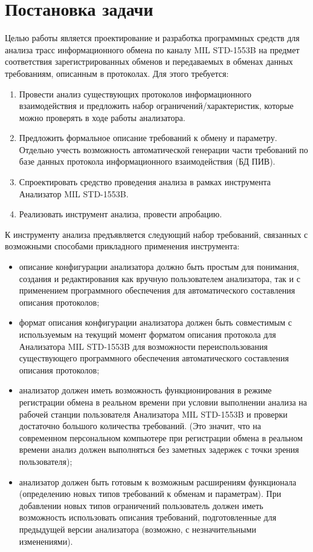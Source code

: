 \section{Постановка задачи}

Целью работы является проектирование и разработка программных средств для 
анализа трасс информационного обмена по каналу MIL STD-1553B на предмет 
соответствия зарегистрированных обменов и передаваемых в обменах данных 
требованиям, описанным в протоколах. Для этого требуется:

\begin{enumerate}
 \item Провести анализ существующих протоколов информационного 
взаимодействия и предложить набор ограничений/характеристик, которые можно 
проверять в ходе работы анализатора.
 \item Предложить формальное описание требований к обмену и параметру. Отдельно 
учесть возможность автоматической генерации части требований по базе данных 
протокола информационного взаимодействия (БД ПИВ).
 \item Спроектировать средство проведения анализа в рамках инструмента 
Анализатор MIL STD-1553B.
 \item Реализовать инструмент анализа, провести апробацию.
\end{enumerate}

К инструменту анализа предъявляется следующий набор требований, связанных с 
возможными способами прикладного применения инструмента:

\begin{itemize}
 \item описание конфигурации анализатора должно быть простым для 
понимания, создания и редактирования как вручную пользователем анализатора, так 
и с применением программного обеспечения для автоматического составления 
описания протоколов;
 \item формат описания конфигурации анализатора должен быть совместимым с 
используемым на текущий момент форматом описания протокола для Анализатора 
MIL STD-1553B для возможности переиспользования существующего программного 
обеспечения автоматического составления описания протоколов;
 \item анализатор должен иметь возможность функционирования в режиме 
регистрации обмена в реальном времени при условии выполнении анализа на 
рабочей станции пользователя Анализатора MIL STD-1553B 
и проверки достаточно большого количества требований. (Это значит, что на 
современном персональном компьютере при регистрации обмена в реальном времени 
анализ должен выполняться без заметных задержек с точки зрения пользователя);
 \item анализатор должен быть готовым к возможным расширениям 
 функционала (определению новых типов требований к обменам и параметрам). При 
добавлении новых типов ограничений пользователь должен иметь возможность 
использовать описания требований, подготовленные для предыдущей версии  
анализатора (возможно, с незначительными изменениями).
\end{itemize}
